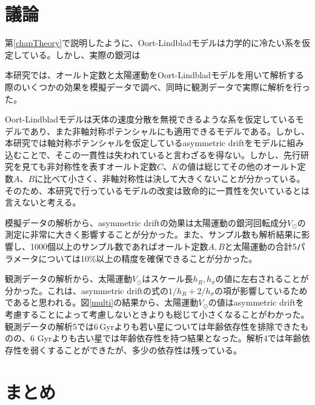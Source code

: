 \chapter{議論 \label{chapDiscussion}}
第\ref{chapTheory}で説明したように、Oort-Lindbladモデルは力学的に冷たい系を仮定している。しかし、実際の銀河は

本研究では、オールト定数と太陽運動をOort-Lindbladモデルを用いて解析する際のいくつかの効果を模擬データで調べ、同時に観測データで実際に解析を行った。

Oort-Lindbladモデルは天体の速度分散を無視できるような系を仮定しているモデルであり、また非軸対称ポテンシャルにも適用できるモデルである。しかし、本研究では軸対称ポテンシャルを仮定しているasymmetric driftをモデルに組み込むことで、そこの一貫性は失われていると言わざるを得ない。しかし、先行研究を見ても非対称性を表すオールト定数$C、K$の値は総じてその他のオールト定数$A、B$に比べて小さく、非軸対称性は決して大きくないことが分かっている。そのため、本研究で行っているモデルの改変は致命的に一貫性を欠いているとは言えないと考える。

模擬データの解析から、asymmetric driftの効果は太陽運動の銀河回転成分$V_{\odot}$の測定に非常に大きく影響することが分かった。また、サンプル数も解析結果に影響し、1000個以上のサンプル数であればオールト定数$A,B$と太陽運動の合計5パラメータについては10\%以上の精度を確保できることが分かった。

観測データの解析から、太陽運動$V_{\odot}$はスケール長$h_R,h_{\sigma}$の値に左右されることが分かった。これは、asymmetric driftの式の$1/h_R + 2/h_{\sigma}$の項が影響しているためであると思われる。図\ref{multi}の結果から、太陽運動$V_{\odot}$の値はasymmetric driftを考慮することによって考慮しないときよりも総じて小さくなることがわかった。観測データの解析5では6\,Gyrよりも若い星については年齢依存性を排除できたものの、6 Gyrよりも古い星では年齢依存性を持つ結果となった。解析4では年齢依存性を弱くすることができたが、多少の依存性は残っている。

\chapter{まとめ \label{chapSummary}}
